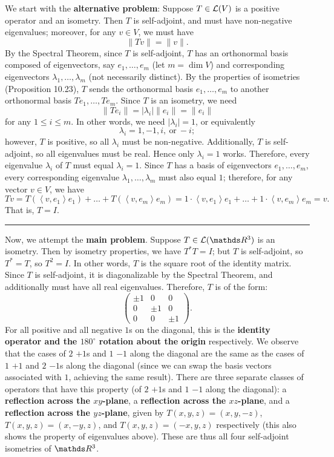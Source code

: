 \documentclass{homework}
\begin{document}
\begin{solution}
  We start with the \textbf{alternative problem}:
  Suppose $T\in \mathcal{L}(V)$ is a positive operator and an isometry. Then $T$ is self-adjoint, and
  must have non-negative eigenvalues; moreover, for any $v\in V$, we must have \[
    \|Tv\|=\|v\|
  .\] By the Spectral Theorem, since $T$ is self-adjoint, $T$ has an orthonormal basis composed of
  eigenvectors, say $e_1,\ldots,e_m$ (let $m=\dim{V}$) and corresponding eigenvectors
  $\lambda_1,\ldots,\lambda_m$ (not necessarily distinct). By the properties of isometries
  (Proposition 10.23), $T$ sends the orthonormal basis $e_1,\ldots,e_m$ to another orthonormal basis
  $Te_1,\ldots,Te_m$. Since $T$ is an isometry, we need \[
    \|Te_i\|=\left| \lambda_i \right| \|e_i\|=\|e_i\|
  \] for any $1\le i\le m$. In other words, we need $\left| \lambda_i \right| =1$, or equivalently
  \[
    \lambda_i=1,-1,i,~\text{or}~-i
  ;\] however, $T$ is positive, so all $\lambda_i$ must be non-negative. Additionally, $T$ is
  self-adjoint, so all eigenvalues must be real. Hence only $\lambda_i=1$ works. Therefore, every
  eigenvalue $\lambda_i$ of $T$ must equal $\lambda_i=1$. Since $T$ has a basis of eigenvectors
  $e_1,\ldots,e_m$, every corresponding eigenvalue $\lambda_1,\ldots,\lambda_m$ must also equal $1$;
  therefore, for any vector $v\in V$, we have \[
    Tv=T(\left<v,e_1 \right>e_1)+\ldots+T(\left<v,e_m \right> e_m)=1\cdot \left<v,e_1 \right>
    e_1+\ldots+1\cdot \left<v,e_m \right> e_m=v
  .\] That is, $T=I$.
  \hrule
  \vspace{1ex}
  Now, we attempt the \textbf{main problem}. Suppose $T\in \mc{L}(\R^3)$ is an isometry. Then by
  isometry properties, we have $T^*T=I$; but $T$ is self-adjoint, so $T^*=T$, so $T^2=I$. In other
  words, $T$ is the square root of the identity matrix. Since $T$ is self-adjoint, it is
  diagonalizable by the Spectral Theorem, and additionally must have all real eigenvalues.
  Therefore, $T$ is of the form: \[
    \begin{pmatrix} \pm 1&0&0 \\0&\pm 1&0\\0&0&\pm 1\end{pmatrix} 
  .\] For all positive and all negative $1$s on the diagonal, this is the \textbf{identity operator and the
  $180^{\circ}$ rotation about the origin} respectively. We observe that the cases of $2$ $+1$s and
  $1$ $-1$ along the diagonal are the same as the cases of $1$ $+1$ and $2$ $-1$s along the diagonal
  (since we can swap the basis vectors associated with $1$, achieving the same result). There are
  three separate classes of operators that have this property (of $2$ $+1$s and $1$ $-1$ along the
  diagonal): a \textbf{reflection across the $xy$-plane}, a \textbf{reflection across the
  $xz$-plane}, and a \textbf{reflection across the $yz$-plane}, given by $T(x,y,z)=(x,y,-z)$,
  $T(x,y,z)=(x,-y,z)$, and $T(x,y,z)=(-x,y,z)$ respectively (this also shows the property of
  eigenvalues above). These are thus all four self-adjoint isometries of $\R^3$.
\end{solution}
\end{document}
